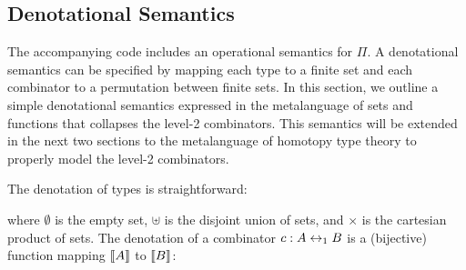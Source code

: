 


\subsection{Denotational Semantics}

\noindent The accompanying code includes an operational semantics for $\Pi$. A denotational semantics can be specified
by mapping each type to a finite set and each combinator to a permutation between finite sets. In this section, we
outline a simple denotational semantics expressed in the metalanguage of sets and functions that collapses the level-2
combinators. This semantics will be extended in the next two sections to the metalanguage of homotopy type theory to
properly model the level-2 combinators.

The denotation of types is straightforward:

\begin{center}
{}
\end{center}

\noindent where $\emptyset$ is the empty set, $\uplus$ is the disjoint union of sets, and $\times$ is the cartesian product of
sets. The denotation of a combinator $c : A \leftrightarrow_1 B$ is a (bijective) function mapping $\llbracket A\rrbracket$ to $\llbracket B\rrbracket$:

